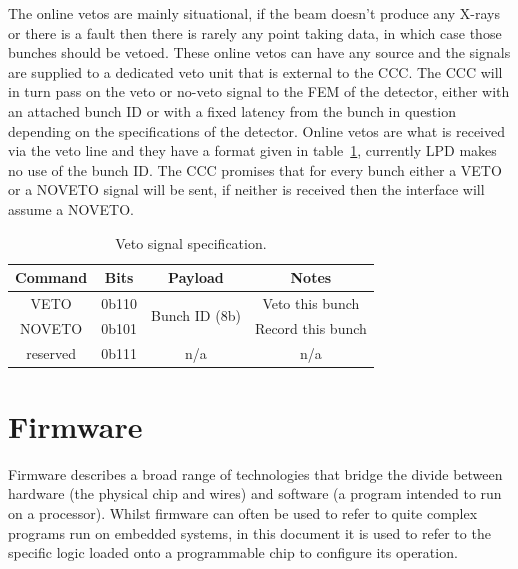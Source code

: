 The online vetos are mainly situational, if the beam doesn't produce any X-rays or there is a fault then there is rarely any point taking data, in which case those bunches should be vetoed. These online vetos can have any source and the signals are supplied to a dedicated veto unit that is external to the CCC. The CCC will in turn pass on the veto or no-veto signal to the FEM of the detector, either with an attached bunch ID or with a fixed latency from the bunch in question depending on the specifications of the detector. Online vetos are what is received via the veto line and they have a format given in table~\ref{tab:veto_spec}, currently LPD makes no use of the bunch ID. The CCC promises that for every bunch either a VETO or a NOVETO signal will be sent, if neither is received then the interface will assume a NOVETO.
\begin{table}[htbp]
  \begin{center}
  \begin{tabular}{c|c|c|c}
    Command & Bits   & Payload                        & Notes\\
    \hline
    VETO    & 0b110  & \multirow{2}{*}{Bunch ID (8b)} & Veto this bunch \\
    NOVETO  & 0b101  &                                & Record this bunch \\
    reserved& 0b111  & n/a                            & n/a \\
  \end{tabular}
  \end{center}
  \caption{Veto signal specification.}
  \label{tab:veto_spec}
\end{table}
\section{Firmware} %
\label{sec:firmware}
Firmware describes a broad range of technologies that bridge the divide between hardware (the physical chip and wires) and software (a program intended to run on a processor). Whilst firmware can often be used to refer to quite complex programs run on embedded systems, in this document it is used to refer to the specific logic loaded onto a programmable chip to configure its operation.

